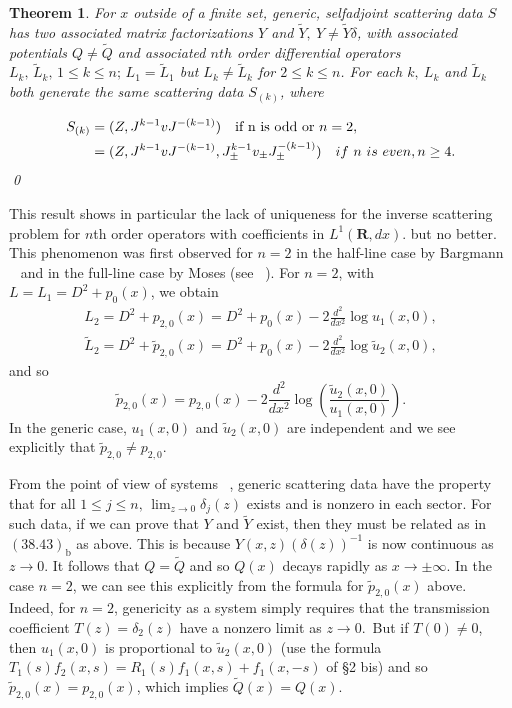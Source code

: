 \documentclass{surv-l}
\theoremstyle{plain}
\newtheorem{theorem}{Theorem}[section]
\theoremstyle{definition}
\numberwithin{equation}{chapter}
\begin{document}
\setcounter{theorem}{43}
\begin{theorem}\label{thm38.44} For $x$ outside of a finite set, generic, selfadjoint scattering data $S$ has two associated matrix factorizations $Y$ and $\tilde{Y},\  Y\neq\tilde{Y}\delta$, with associated potentials $Q\neq\tilde{Q}$ and associated $nth$ order differential operators $L_{k},\, \tilde{L}_{k},\, 1\leq k\leq n\mathrm{;}\, L_{1}=\tilde{L}_{1}$ but $L_{k}\neq\tilde{L}_{k}$ for $2\leq k\leq n$. For each $k,\ L_{k}$ and $\tilde{L}_{k}$ both generate the same scattering data $S_{(k)}$, where

\begin{align*}
S_{(k)}&= (Z, J^{k-1}vJ^{-(k-1)})\quad  \text{if n is odd or } n=2,\\
&=(Z,J^{k-1}vJ^{-(k-1)}, J_{\pm}^{k-1}v_{\pm} J_{\pm}^{-(k-1)})\quad if\ n\ is\ even, n\geq 4.\qedhere
\end{align*}\qed
\end{theorem}
This result shows in particular the lack of uniqueness for the inverse scattering problem for $n$th order operators with coefficients in $L^{1}(\mathbf{R}, dx)$. but no better. This phenomenon was first observed for $n=2$ in the half-line case by Bargmann ~\cite{Ba1,Ba2} and in the full-line case by Moses (see ~\cite{ADM, AN, Sa}). For $n=2$, with $L=L_{1}=D^{2}+p_{0}(x)$, we obtain
\begin{align*}
L_{2}=D^{2}+p_{2,0}(x)=D^{2}+p_{0}(x)-2\frac{d^{2}}{dx^{2}}\log u_{1}(x, 0),\\
\tilde{L}_{2}=D^{2}+\tilde{p}_{2,0}(x)=D^{2}+p_{0}(x)-2\frac{d^{2}}{dx^{2}}\log\tilde{u}_{2}(x, 0),
\end{align*}
and so
\begin{equation*}
\tilde{p}_{2,0}(x)=p_{2,0}(x)-2\frac{d^{2}}{dx^{2}}\log\left(\frac{\tilde{u}_{2}(x,0)}{u_{1}(x,0)}\right).
\end{equation*}
In the generic case, $u_{1}(x,0)$ and $\tilde{u}_{2}(x,0)$ are independent and we see explicitly that $\tilde{p}_{2,0}\neq p_{2,0}$.

From the point of view of systems ~\cite{BC1}, generic scattering data have the property that for all $1\leq j\leq n,\,\lim_{z\rightarrow 0}\delta_{j}(z)$ exists and is nonzero in each sector. For such data, if we can prove that $Y$ and $\tilde{Y}$ exist, then they must be related as in $(38.43)_{\mathrm{b}}$ as above. This is because $Y(x, z)(\delta(z))^{-1}$ is now continuous as $z\rightarrow 0$. It follows that $Q=\tilde{Q}$ and so $Q(x)$ decays rapidly as $ x\rightarrow\pm\infty$. In the case $n=2$, we can see this explicitly from the formula for $\tilde{p}_{2,0}(x)$ above. Indeed, for $n=2$, genericity as a system simply requires that the transmission coefficient $T(z)=\delta_{2}(z)$ have a nonzero limit as $z\rightarrow 0$.\ But if $T(0)\neq 0$, then $u_{1}(x, 0)$ is proportional to $\tilde{u}_{2} (x, 0)$ (use the formula $T_{1}(s)f_{2}(x, s)=R_{1}(s)f_{1}(x, s)+f_{1}(x,-s)$ of \S 2 bis) and so $\tilde{p}_{2,0}(x)=p_{2,0}(x)$, which implies $\tilde{Q}(x)=Q(x)$.
\end{document}
